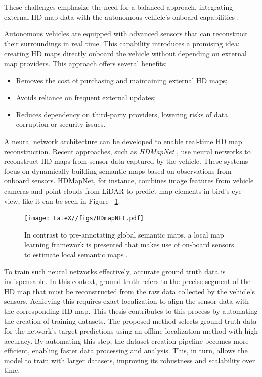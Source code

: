 These challenges emphasize the need for a balanced approach, integrating external HD map data with the autonomous vehicle's onboard capabilities \cite{SEIF2016159, bao2022highdefinitionmapgenerationtechnologies}.

Autonomous vehicles are equipped with advanced sensors that can reconstruct their surroundings in real time. This capability introduces a promising idea: creating HD maps directly onboard the vehicle without depending on external map providers. This approach offers several benefits:
\begin{itemize}
    \item Removes the cost of purchasing and maintaining external HD maps;
    \item Avoids reliance on frequent external updates;
    \item Reduces dependency on third-party providers, lowering risks of data corruption or security issues.
\end{itemize}

A neural network architecture can be developed to enable real-time HD map reconstruction. Recent approaches, such as \textit{HDMapNet} \cite{li2022hdmapnetonlinehdmap}, use neural networks to reconstruct HD maps from sensor data captured by the vehicle. These systems focus on dynamically building semantic maps based on observations from onboard sensors. HDMapNet, for instance, combines image features from vehicle cameras and point clouds from LiDAR to predict map elements in bird's-eye view, like it can be seen in Figure ~\ref{fig:hd_map_net}.
\begin{figure}[H]
    \centering
    \texttt{[image: LateX//figs/HDmapNET.pdf]}
    \caption{In contrast to pre-annotating global semantic maps, a local map learning framework is presented that makes use of on-board sensors to estimate local semantic maps \cite{li2022hdmapnetonlinehdmap}.}
    \label{fig:hd_map_net}
\end{figure}

To train such neural networks effectively, accurate ground truth data is indispensable. In this context, ground truth refers to the precise segment of the HD map that must be reconstructed from the raw data collected by the vehicle's sensors. Achieving this requires exact localization to align the sensor data with the corresponding HD map. This thesis contributes to this process by automating the creation of training datasets. The proposed method selects ground truth data for the network's target predictions using an offline localization method with high accuracy. By automating this step, the dataset creation pipeline becomes more efficient, enabling faster data processing and analysis. This, in turn, allows the model to train with larger datasets, improving its robustness and scalability over time.

